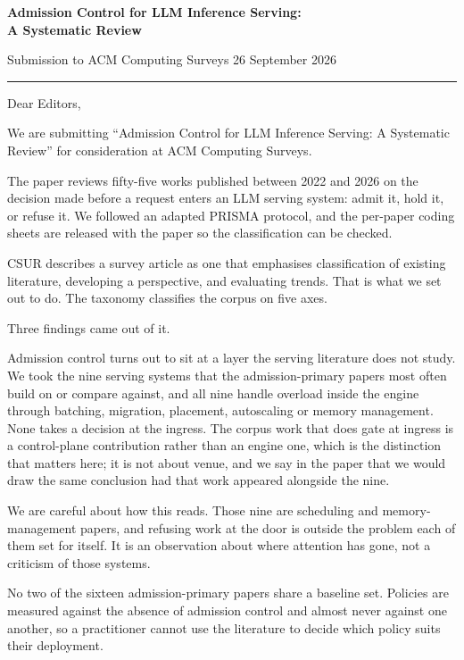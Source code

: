 \documentclass[10pt]{article}
\newcommand{\submissiondate}{26 September 2026}
\begin{document}
\noindent
{\large\bfseries Admission Control for LLM Inference Serving:\\ A Systematic Review}

\vspace{0.4em}
\noindent
Submission to ACM Computing Surveys \hfill \submissiondate

\vspace{0.7em}
\hrule
\vspace{0.7em}

\noindent
Dear Editors,

We are submitting ``Admission Control for LLM Inference Serving: A Systematic
Review'' for consideration at ACM Computing Surveys.

The paper reviews fifty-five works published between 2022 and 2026 on the
decision made before a request enters an LLM serving system: admit it, hold it,
or refuse it. We followed an adapted PRISMA protocol, and the per-paper coding
sheets are released with the paper so the classification can be checked.

CSUR describes a survey article as one that emphasises classification of
existing literature, developing a perspective, and evaluating trends. That is
what we set out to do. The taxonomy classifies the corpus on five axes.

Three findings came out of it.

Admission control turns out to sit at a layer the serving literature does not
study. We took the nine serving systems that the admission-primary papers most
often build on or compare against, and all nine handle overload inside the
engine through batching, migration, placement, autoscaling or memory management.
None takes a decision at the ingress. The corpus work that does gate at ingress
is a control-plane contribution rather than an engine one, which is the
distinction that matters here; it is not about venue, and we say in the paper
that we would draw the same conclusion had that work appeared alongside the
nine.

We are careful about how this reads. Those nine are scheduling and
memory-management papers, and refusing work at the door is outside the problem
each of them set for itself. It is an observation about where attention has
gone, not a criticism of those systems.

No two of the sixteen admission-primary papers share a baseline set. Policies
are measured against the absence of admission control and almost never against
one another, so a practitioner cannot use the literature to decide which policy
suits their deployment.
\end{document}
